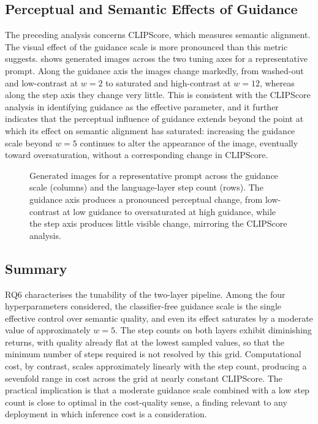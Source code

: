 \documentclass[a4paper,twoside,12pt]{report}
\begin{document}
\subsection{Perceptual and Semantic Effects of Guidance}

The preceding analysis concerns CLIPScore, which measures semantic alignment.
The visual effect of the guidance scale is more pronounced than this metric
suggests.  shows generated images across the two tuning axes
for a representative prompt. Along the guidance axis the images change markedly,
from washed-out and low-contrast at \(w = 2\) to saturated and high-contrast at
\(w = 12\), whereas along the step axis they change very little. This is
consistent with the CLIPScore analysis in identifying guidance as the effective
parameter, and it further indicates that the perceptual influence of guidance
extends beyond the point at which its effect on semantic alignment has
saturated: increasing the guidance scale beyond \(w = 5\) continues to alter the
appearance of the image, eventually toward oversaturation, without a
corresponding change in CLIPScore.

\begin{figure}[H]
\centering
\caption[Generated images across the tuning axes]{Generated images for a
representative prompt across the guidance scale (columns) and the language-layer
step count (rows). The guidance axis produces a pronounced perceptual change,
from low-contrast at low guidance to oversaturated at high guidance, while the
step axis produces little visible change, mirroring the CLIPScore analysis.}
\label{fig:rq6_grid}
\end{figure}

\subsection{Summary}

RQ6 characterises the tunability of the two-layer pipeline. Among the four
hyperparameters considered, the classifier-free guidance scale is the single
effective control over semantic quality, and even its effect saturates by a
moderate value of approximately \(w = 5\). The step counts on both layers
exhibit diminishing returns, with quality already flat at the lowest sampled
values, so that the minimum number of steps required is not resolved by this
grid. Computational cost, by contrast, scales approximately linearly with the
step count, producing a sevenfold range in cost across the grid at nearly
constant CLIPScore. The practical implication is that a moderate guidance scale
combined with a low step count is close to optimal in the cost-quality sense, a
finding relevant to any deployment in which inference cost is a consideration.
\end{document}
